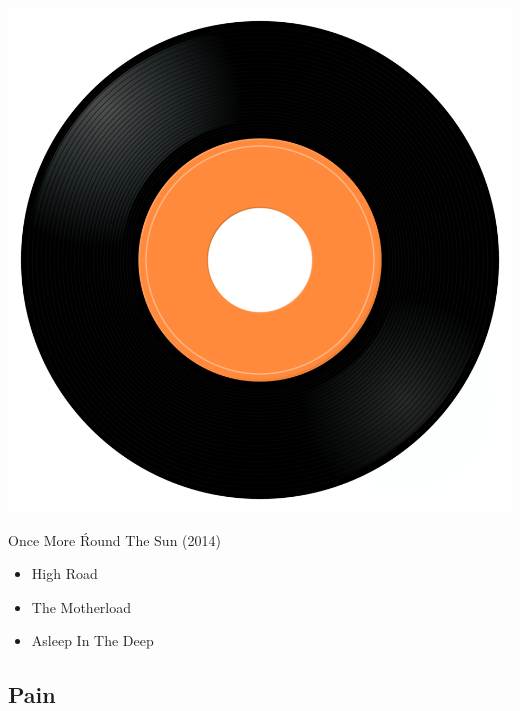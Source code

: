 \begin{minipage}[t]{0.25\textwidth}
\captionsetup{type=figure}
\includegraphics[width=\textwidth]{Images/cover.png}
\caption*{Once More \'Round The Sun (2014)}
\end{minipage}
\begin{minipage}[t]{0.25\textwidth}\vspace{0pt}
\begin{itemize}[nosep,leftmargin=1em,labelwidth=*,align=left]
	\setlength{\itemsep}{0pt}
	\item High Road
	\item The Motherload
	\item Asleep In The Deep
\end{itemize}
\end{minipage}

\subsection{Pain}

